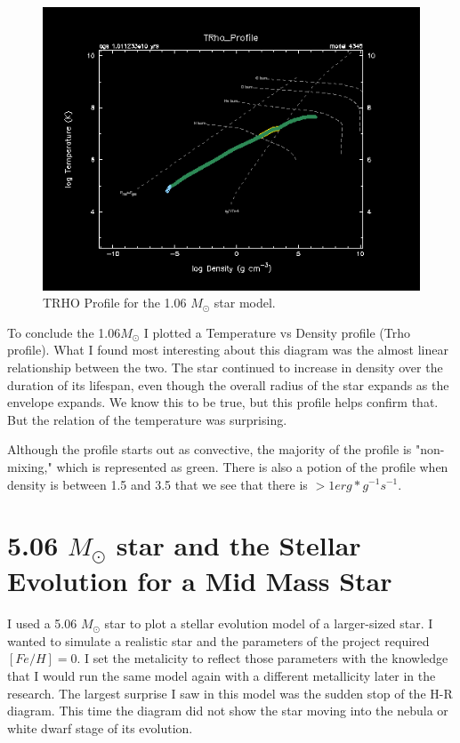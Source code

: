 \documentclass[fleqn,usenatbib]{mnras}
\begin{document}
\begin{figure}

    \includegraphics[width=\columnwidth]{1.06_trho_profile.png}
    \caption{TRHO Profile for the 1.06 $M_\odot$ star model.}
    \label{fig:1.06_Msol_trho_figure}
\end{figure}


\par To conclude the 1.06\(M_\odot\) I plotted a Temperature vs Density profile (Trho profile).  What I found most interesting about this diagram was the almost linear relationship between the two. The star continued to increase in density over the duration of its lifespan, even though the overall radius of the star expands as the envelope expands.  We know this to be true, but this profile helps confirm that.  But the relation of the temperature was surprising.
\par Although the profile starts out as convective, the majority of the profile is "non-mixing," which is represented as green.  There is also a potion of the profile when density is between 1.5 and 3.5 that we see that there is $ > 1 erg* g^{-1}s^{-1}$. 

\section{5.06 \(M_\odot\) star and the Stellar Evolution for a Mid Mass Star}
I used a 5.06 \(M_\odot\) star to plot a stellar evolution model of a larger-sized star. I wanted to simulate a realistic star and the parameters of the project required $ [Fe/H]=0 $.  I set the metalicity to reflect those parameters with the knowledge that I would run the same model again with a different metallicity later in the research. The largest surprise I saw in this model was the sudden stop of the H-R diagram.  This time the diagram did not show the star moving into the nebula or white dwarf stage of its evolution.
\end{document}
